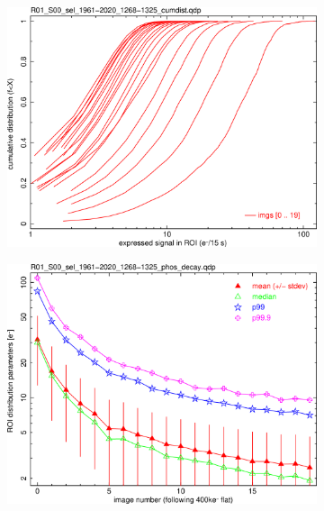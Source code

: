 \begin{figure}[!htbp]
\begin{subfigure}{0.45\textwidth}    
  \centering
  \includegraphics[width=\textwidth]{figures/phosphorescence-survey/phos_kinetics/R01_S00_sel_1961-2020_1268-1325_cumdist.png}    
\end{subfigure}
\hfil
\begin{subfigure}{0.45\textwidth}
  \centering
  \includegraphics[width=\textwidth]{figures/phosphorescence-survey/phos_kinetics/R01_S00_sel_1961-2020_1268-1325_phos_decay.png}
\end{subfigure}
\newline
\begin{subfigure}{0.45\textwidth}    

\end{subfigure}
\end{figure}
